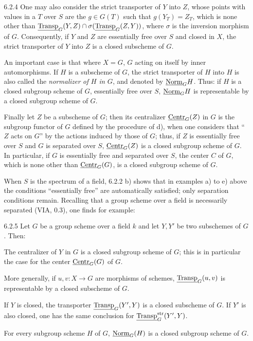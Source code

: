 \begin{examples}{6.2.4}
One may also consider the strict transporter of $Y$ into $Z$, whose points with values in a $T$ over $S$ are the $g\in G(T)$ such that $g(Y_T)=Z_T$, which is none other than $\underline{\operatorname{Transp}}_G(Y,Z)\cap\sigma(\underline{\operatorname{Transp}}_G(Z,Y))$, where $\sigma$ is the inversion morphism of $G$. Consequently, if $Y$ and $Z$ are essentially free over $S$ and closed in $X$, the strict transporter of $Y$ into $Z$ is a closed subscheme of $G$.

An important case is that where $X=G$, $G$ acting on itself by inner automorphisms. If $H$ is a subscheme of $G$, the strict transporter of $H$ into $H$ is also called the \emph{normalizer of $H$ in $G$}, and denoted by $\underline{\mathrm{Norm}}_GH$. Thus: if $H$ is a closed subgroup scheme of $G$, essentially free over $S$, $\underline{\mathrm{Norm}}_GH$ is representable by a closed subgroup scheme of $G$.

Finally let $Z$ be a subscheme of $G$; then its centralizer $\underline{\mathrm{Centr}}_G(Z)$ in $G$ is the subgroup functor of $G$ defined by the procedure of d), when one considers that ``$Z$ acts on $G$'' by the actions induced by those of $G$; thus, if $Z$ is essentially free over $S$ and $G$ is separated over $S$, $\underline{\mathrm{Centr}}_G(Z)$ is a closed subgroup scheme of $G$. In particular, if $G$ is essentially free and separated over $S$, the center $C$ of $G$, which is none other than $\underline{\mathrm{Centr}}_G(G)$, is a closed subgroup scheme of $G$.

When $S$ is the spectrum of a field, 6.2.2 b) shows that in examples a) to e) above the conditions ``essentially free'' are automatically satisfied; only separation conditions remain. Recalling that a group scheme over a field is necessarily separated (VIA, 0.3), one finds for example:
\end{examples}
\begin{corollary}{6.2.5}\label{VIB.6.2.5}
Let $G$ be a group scheme over a field $k$ and let $Y,Y'$ be two subschemes of $G$. Then:
\begin{enumeratei}
\item The centralizer of $Y$ in $G$ is a closed subgroup scheme of $G$; this is in particular the case for the center $\underline{\mathrm{Centr}}_G(G)$ of $G$.
\item[(i$'$)] More generally, if $u,v:X\to G$ are morphisms of schemes, $\underline{\operatorname{Transp}}_G(u,v)$ is representable by a closed subscheme of $G$.
\item[(ii)] If $Y$ is closed, the transporter $\underline{\operatorname{Transp}}_G(Y',Y)$ is a closed subscheme of $G$. If $Y'$ is also closed, one has the same conclusion for $\underline{\operatorname{Transp}}_G^{\mathrm{str}}(Y',Y)$.
\item[(iii)] For every subgroup scheme $H$ of $G$, $\underline{\mathrm{Norm}}_G(H)$ is a closed subgroup scheme of $G$.
\end{enumeratei}
\end{corollary}
